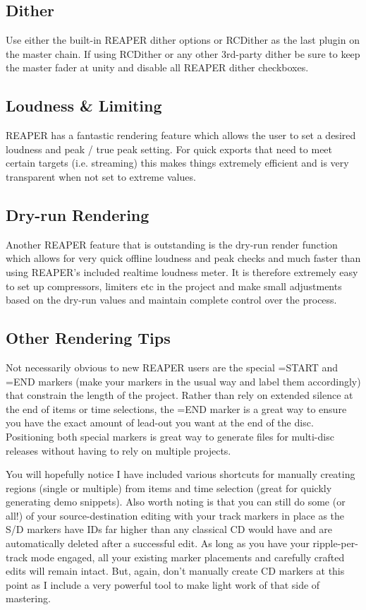 \documentclass[10pt,american]{article}
\begin{document}
\subsection{Dither}

Use either the built-in REAPER dither options or RCDither as the last plugin on
the master chain. If using RCDither or any other 3rd-party dither be sure to
keep the master fader at unity and disable all REAPER dither checkboxes.

\subsection{Loudness \& Limiting}

REAPER has a fantastic rendering feature which allows the user to set a desired
loudness and peak / true peak setting. For quick exports that need to meet
certain targets (i.e. streaming) this makes things extremely efficient and is
very transparent when not set to extreme values.

\subsection{Dry-run Rendering}

Another REAPER feature that is outstanding is the dry-run render function which
allows for very quick offline loudness and peak checks and much faster than
using REAPER's included realtime loudness meter. It is therefore extremely easy
to set up compressors, limiters etc in the project and make small adjustments
based on the dry-run values and maintain complete control over the process. 

\subsection{Other Rendering Tips}

Not necessarily obvious to new REAPER users are the special =START and =END
markers (make your markers in the usual way and label them accordingly) that
constrain the length of the project. Rather than rely on extended silence at the
end of items or time selections, the =END marker is a great way to ensure you
have the exact amount of lead-out you want at the end of the disc. Positioning
both special markers is great way to generate files for multi-disc releases
without having to rely on multiple projects.

You will hopefully notice I have included various shortcuts for manually
creating regions (single or multiple) from items and time selection (great for
quickly generating demo snippets). Also worth noting is that you can still do
some (or all!) of your source-destination editing with your track markers in
place as the S/D markers have IDs far higher than any classical CD would have
and are automatically deleted after a successful edit. As long as you have your
ripple-per-track mode engaged, all your existing marker placements and carefully
crafted edits will remain intact. But, again, don't manually create CD markers
at this point as I include a very powerful tool to make light work of that side
of mastering.
\end{document}
